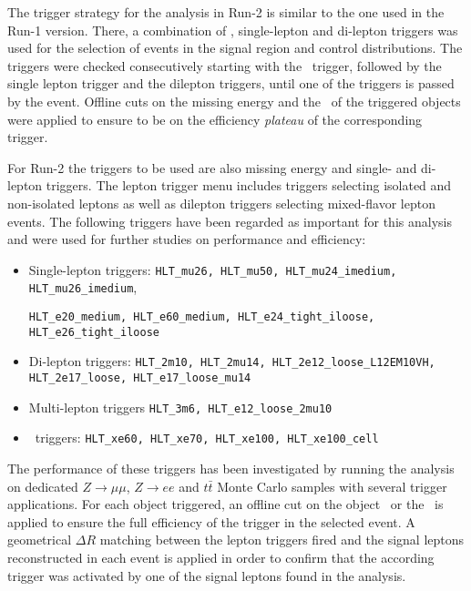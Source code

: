 The trigger strategy for the analysis in Run-2 is similar to the one used in the Run-1 version. There, a combination of \met , 
single-lepton and di-lepton triggers was used for the selection of events in the signal region and control distributions. The triggers were checked consecutively starting with the \met\ trigger, followed by the single lepton trigger and the dilepton triggers, until one of the triggers is passed by the event. Offline cuts on the missing energy and the \pt\ of the triggered objects were applied to ensure to be on the efficiency \textit{plateau} of the corresponding trigger.

For Run-2 the triggers to be used are also missing energy and single- and di-lepton triggers. The lepton trigger menu includes triggers selecting isolated and non-isolated leptons as well as dilepton triggers selecting mixed-flavor lepton events. 
The following triggers have been regarded as important for this analysis and were used for further studies on performance and efficiency:

\begin{itemize}
\item Single-lepton triggers: \texttt{HLT\_mu26, HLT\_mu50, HLT\_mu24\_imedium, HLT\_mu26\_imedium}, 

\texttt{HLT\_e20\_medium, HLT\_e60\_medium, HLT\_e24\_tight\_iloose, HLT\_e26\_tight\_iloose}

\item Di-lepton triggers: \texttt{HLT\_2m10, HLT\_2mu14, HLT\_2e12\_loose\_L12EM10VH, HLT\_2e17\_loose, HLT\_e17\_loose\_mu14}

\item Multi-lepton triggers \texttt{HLT\_3m6, HLT\_e12\_loose\_2mu10}

\item \met\ triggers: \texttt{HLT\_xe60, HLT\_xe70, HLT\_xe100, HLT\_xe100\_cell}

\end{itemize}

The performance of these triggers has been investigated by running the analysis 
on dedicated $Z \rightarrow \mu \mu$, $Z \rightarrow ee$ and $t \bar{t}$ Monte 
Carlo samples with several trigger applications.
For each object triggered, an offline cut on the object \pt\ or the \met\ is applied to ensure the full efficiency of the trigger in the selected event. A geometrical $\Delta R$ matching between the lepton triggers fired and the signal leptons reconstructed in each event is applied in order to confirm that the according trigger was activated by one of the signal leptons found in the analysis. 


